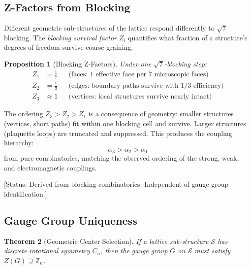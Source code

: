 \documentclass[12pt,a4paper]{article}
\theoremstyle{plain}
\newtheorem{theorem}{Theorem}[section]
\newtheorem{proposition}[theorem]{Proposition}
\theoremstyle{definition}
\newcommand{\elabel}[1]{\textsf{\small [#1]}}
\begin{document}
\subsection{Z-Factors from Blocking}\label{sec:zfactors}

Different geometric sub-structures of the lattice respond differently to $\sqrt{7}$ blocking. The \emph{blocking survival factor} $Z_i$ quantifies what fraction of a structure's degrees of freedom survive coarse-graining.

\begin{proposition}[Blocking Z-Factors]\label{prop:zfactors}
Under one $\sqrt{7}$-blocking step:
\begin{align}
Z_1 &= \frac{1}{7} && \text{(faces: 1 effective face per 7 microscopic faces)} \\
Z_2 &= \frac{1}{3} && \text{(edges: boundary paths survive with 1/3 efficiency)} \\
Z_3 &\approx 1 && \text{(vertices: local structures survive nearly intact)}
\end{align}
\end{proposition}

The ordering $Z_3 > Z_2 > Z_1$ is a consequence of geometry: smaller structures (vertices, short paths) fit within one blocking cell and survive. Larger structures (plaquette loops) are truncated and suppressed. This produces the coupling hierarchy:
\begin{equation}
\alpha_3 > \alpha_2 > \alpha_1
\end{equation}
from pure combinatorics, matching the observed ordering of the strong, weak, and electromagnetic couplings.

\elabel{Status: Derived from blocking combinatorics. Independent of gauge group identification.}

\subsection{Gauge Group Uniqueness}\label{sec:gauge-groups}

\begin{theorem}[Geometric Center Selection]\label{thm:center}
If a lattice sub-structure $\mathcal{S}$ has discrete rotational symmetry $C_n$, then the gauge group $G$ on $\mathcal{S}$ must satisfy $Z(G) \supseteq \mathbb{Z}_n$.
\end{theorem}
\end{document}
